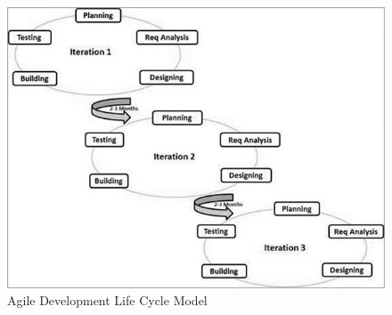 \begin{figure}[!htb]
\centering
\includegraphics[width=\textwidth]{section02/assets/sdlc_agile_model.jpg}
\caption[Agile Development Life Cycle Model]{\label{fig:Agile Model}Agile Development Life Cycle Model}
\end{figure}

